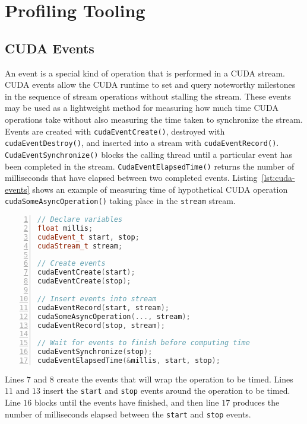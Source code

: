 \section{Profiling Tooling}
\label{sec:profiling}

\subsection{CUDA Events}

An event is a special kind of operation that is performed in a CUDA stream.
CUDA events allow the CUDA runtime to set and query noteworthy milestones in the sequence of stream operations without stalling the stream.
These events may be used as a lightweight method for measuring how much time CUDA operations take without also measuring the time taken to synchronize the stream.
Events are created with \texttt{cudaEventCreate()}, destroyed with \texttt{cudaEventDestroy()}, and inserted into a stream with \texttt{cudaEventRecord()}.
\texttt{CudaEventSynchronize()} blocks the calling thread until a particular event has been completed in the stream.
\texttt{CudaEventElapsedTime()} returns the number of milliseconds that have elapsed between two completed events.
Listing~\ref{lst:cuda-events} shows an example of measuring time of hypothetical CUDA operation \texttt{cudaSomeAsyncOperation()} taking place in the \texttt{stream} stream.

\begin{minipage}{\linewidth}
\begin{lstlisting}[language=C++, caption=Measuring time with CUDA events., label=lst:cuda-events, numbers=left]
// Declare variables
float millis;
cudaEvent_t start, stop;
cudaStream_t stream;

// Create events
cudaEventCreate(start);
cudaEventCreate(stop);

// Insert events into stream
cudaEventRecord(start, stream);
cudaSomeAsyncOperation(..., stream);
cudaEventRecord(stop, stream);

// Wait for events to finish before computing time
cudaEventSynchronize(stop);
cudaEventElapsedTime(&millis, start, stop);
\end{lstlisting}
\end{minipage}

Lines $7$ and $8$ create the events that will wrap the operation to be timed.
Lines $11$ and $13$ insert the \texttt{start} and \texttt{stop} events around the operation to be timed.
Line $16$ blocks until the events have finished, and then line $17$ produces the number of milliseconds elapsed between the \texttt{start} and \texttt{stop} events.

